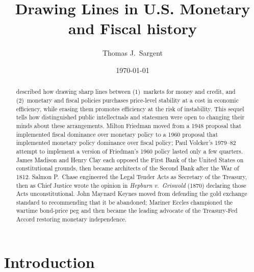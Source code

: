 \documentclass[12pt]{article}
\title{Drawing Lines in U.S. Monetary and Fiscal history}
\author{Thomas J.~Sargent}
\date{\today}
\begin{document}
\maketitle

\begin{abstract}
 \citet{Sargent2011}
described  how  drawing sharp
lines between (1)~markets for money and credit, and (2)~monetary and
fiscal policies purchases price-level stability at a cost in economic efficiency, while
erasing them promotes efficiency at the risk of instability.  This sequel tells how distinguished public intellectuals and statesmen were open to changing their minds about these arrangements.  Milton
Friedman moved from a 1948 proposal that implemented fiscal dominance over monetary policy to a 1960 proposal that implemented monetary policy dominance over fiscal policy;   Paul Volcker's 1979--82 attempt
to implement a version of Friedman's 1960 policy lasted only a few quarters.    James 
Madison and Henry Clay each opposed the First Bank of the United States  on constitutional grounds, then
became architects of the Second Bank after the War of 1812.  Salmon P.\ Chase
engineered the Legal Tender Acts as Secretary of the Treasury, then as
Chief Justice wrote the opinion in \textit{Hepburn v.\ Griswold} (1870)
declaring those  Acts unconstitutional. John Maynard  Keynes moved from defending the gold
exchange standard to recommending that it be abandoned; Mariner  Eccles
championed the wartime bond-price peg and then became the leading
advocate of the Treasury-Fed Accord restoring monetary independence.   
\end{abstract}
%
%
\section{Introduction}
\end{document}
